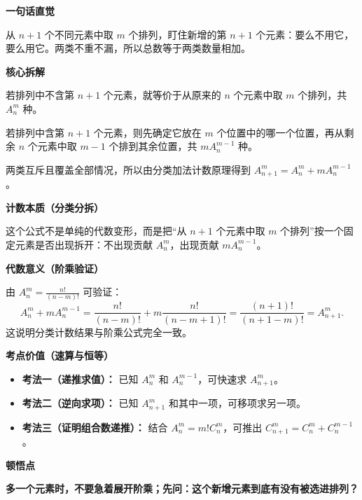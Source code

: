 \begin{explanationbox}
\textbf{\textcolor{CExplanation}{一句话直觉}}

从 $n+1$ 个不同元素中取 $m$ 个排列，盯住新增的第 $n+1$ 个元素：要么不用它，要么用它。两类不重不漏，所以总数等于两类数量相加。

\medskip
\textbf{\textcolor{CExplanation}{核心拆解}}
\begin{description}[style=nextline, leftmargin=2.8em, labelsep=0.5em, itemsep=0.45em]
    \item[\textbf{要点一（不含新增元素）：}] 若排列中不含第 $n+1$ 个元素，就等价于从原来的 $n$ 个元素中取 $m$ 个排列，共 $A_n^m$ 种。
    \item[\textbf{要点二（含新增元素）：}] 若排列中含第 $n+1$ 个元素，则先确定它放在 $m$ 个位置中的哪一个位置，再从剩余 $n$ 个元素中取 $m-1$ 个排到其余位置，共 $mA_n^{m-1}$ 种。
    \item[\textbf{要点三（分类相加）：}] 两类互斥且覆盖全部情况，所以由分类加法计数原理得到 $A_{n+1}^{m}=A_n^m+mA_n^{m-1}$。
\end{description}

\medskip
\textbf{\textcolor{CExplanation}{计数本质（分类分拆）}}

这个公式不是单纯的代数变形，而是把“从 $n+1$ 个元素中取 $m$ 个排列”按一个固定元素是否出现拆开：不出现贡献 $A_n^m$，出现贡献 $mA_n^{m-1}$。

\medskip
\textbf{\textcolor{CExplanation}{代数意义（阶乘验证）}}

由 $A_n^m=\frac{n!}{(n-m)!}$ 可验证：
\[
A_n^m+mA_n^{m-1}
=\frac{n!}{(n-m)!}+m\frac{n!}{(n-m+1)!}
=\frac{(n+1)!}{(n+1-m)!}
=A_{n+1}^m.
\]
这说明分类计数结果与阶乘公式完全一致。

\medskip
\textbf{\textcolor{CExplanation}{考点价值（速算与恒等）}}
\begin{itemize}[leftmargin=*, itemsep=0.5em, topsep=0.4em]
    \item \textbf{考法一（递推求值）：} 已知 $A_n^m$ 和 $A_n^{m-1}$，可快速求 $A_{n+1}^m$。
    \item \textbf{考法二（逆向求项）：} 已知 $A_{n+1}^m$ 和其中一项，可移项求另一项。
    \item \textbf{考法三（证明组合数递推）：} 结合 $A_n^m=m!C_n^m$，可推出 $C_{n+1}^m=C_n^m+C_n^{m-1}$。
\end{itemize}

\medskip
\textbf{\textcolor{CExplanation}{顿悟点}}

\textbf{多一个元素时，不要急着展开阶乘；先问：这个新增元素到底有没有被选进排列？}

\end{explanationbox}
